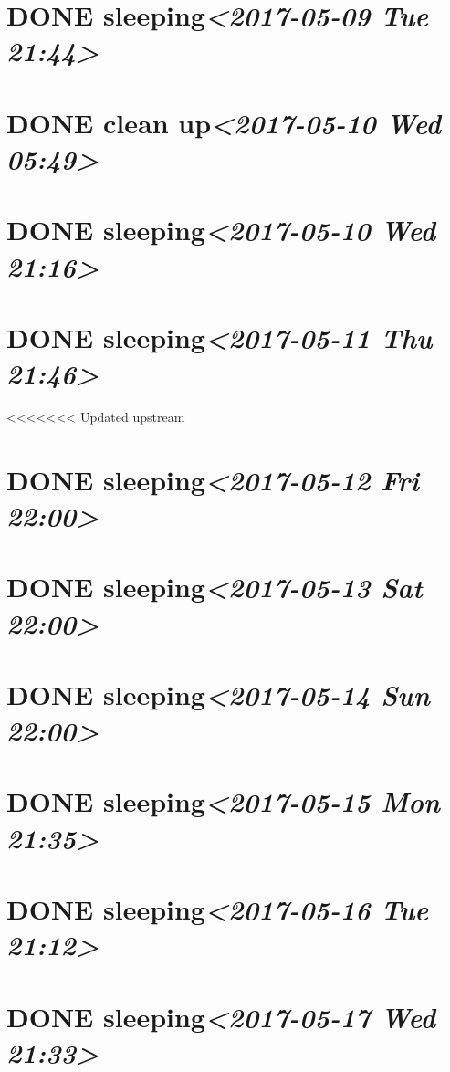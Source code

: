\documentclass[cyan]{elegantnote}
\begin{document}
\section{{\bfseries\sffamily DONE} sleeping\textit{<2017-05-09 Tue 21:44>}}
\label{sec:org4224d44}
\section{{\bfseries\sffamily DONE} clean up\textit{<2017-05-10 Wed 05:49>}}
\label{sec:orgbf798e2}
\section{{\bfseries\sffamily DONE} sleeping\textit{<2017-05-10 Wed 21:16>}}
\label{sec:orgebae29e}
\section{{\bfseries\sffamily DONE} sleeping\textit{<2017-05-11 Thu 21:46>}}
\label{sec:org52d81c2}
<<<<<<< Updated upstream
\section{{\bfseries\sffamily DONE} sleeping\textit{<2017-05-12 Fri 22:00>}}
\label{sec:orgc95a122}
\section{{\bfseries\sffamily DONE} sleeping\textit{<2017-05-13 Sat 22:00>}}
\label{sec:org2976a2c}
\section{{\bfseries\sffamily DONE} sleeping\textit{<2017-05-14 Sun 22:00>}}
\label{sec:org97b3222}
\section{{\bfseries\sffamily DONE} sleeping\textit{<2017-05-15 Mon 21:35>}}
\label{sec:org45073dc}
\section{{\bfseries\sffamily DONE} sleeping\textit{<2017-05-16 Tue 21:12>}}
\label{sec:orgfe09354}
\section{{\bfseries\sffamily DONE} sleeping\textit{<2017-05-17 Wed 21:33>}}
\label{sec:org89ee551}
\end{document}
